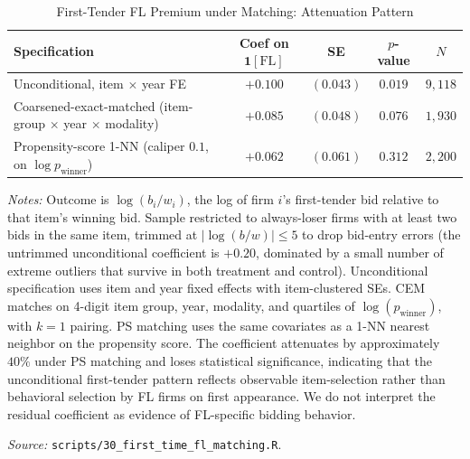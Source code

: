 \begin{table}[htbp]
\centering
\caption{First-Tender FL Premium under Matching: Attenuation Pattern}
\label{tab:matched_first_time}
\begin{threeparttable}
\small
\begin{tabular}{lcccc}
\toprule
Specification & Coef on $\mathbf{1}[\text{FL}]$ & SE & $p$-value & $N$ \\
\midrule
Unconditional, item $\times$ year FE                                   & $+0.100$  & $(0.043)$ & $0.019$  & $9{,}118$ \\
Coarsened-exact-matched (item-group $\times$ year $\times$ modality)   & $+0.085$  & $(0.048)$ & $0.076$  & $1{,}930$ \\
Propensity-score 1-NN (caliper $0.1$, on $\log p_{\text{winner}}$)     & $+0.062$  & $(0.061)$ & $0.312$  & $2{,}200$ \\
\bottomrule
\end{tabular}
\begin{tablenotes}
\small
\item \textit{Notes:} Outcome is $\log(b_i / w_i)$, the log of
firm $i$'s first-tender bid relative to that item's winning
bid. Sample restricted to always-loser firms with at least
two bids in the same item, trimmed at $|\log(b/w)| \leq 5$ to
drop bid-entry errors (the untrimmed unconditional coefficient
is $+0.20$, dominated by a small number of extreme outliers
that survive in both treatment and control). Unconditional
specification uses item and year fixed effects with
item-clustered SEs. CEM matches on 4-digit item group, year,
modality, and quartiles of $\log(p_{\text{winner}})$, with
$k=1$ pairing. PS matching uses the same covariates as a
1-NN nearest neighbor on the propensity score. The
coefficient attenuates by approximately $40\%$ under PS matching
and loses statistical significance, indicating that the
unconditional first-tender pattern reflects observable
item-selection rather than behavioral selection by FL firms
on first appearance. We do not interpret the residual
coefficient as evidence of FL-specific bidding behavior.
\item \textit{Source:} \texttt{scripts/30\_first\_time\_fl\_matching.R}.
\end{tablenotes}
\end{threeparttable}
\end{table}
